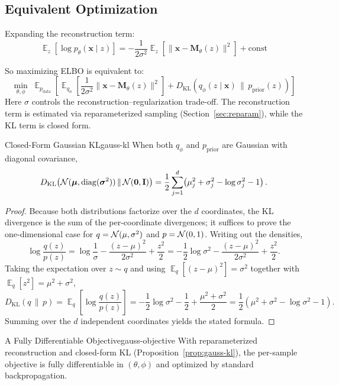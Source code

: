 \documentclass[11pt,a4paper]{article}
\DeclareMathOperator*{\E}{\mathbb{E}}
\DeclareMathOperator{\diag}{diag}
\newcommand{\bx}{\mathbf{x}} \newcommand{\by}{\mathbf{y}}
\newcommand{\bmu}{\boldsymbol{\mu}}
\newcommand{\bsigma}{\boldsymbol{\sigma}}
\newcommand{\KL}[2]{D_{\mathrm{KL}}\!\left(#1\,\|\,#2\right)}
\newcommand{\pdata}{p_{\mathrm{data}}}
\newcommand{\pprior}{p_{\mathrm{prior}}}
\begin{document}
\subsection{Equivalent Optimization}

Expanding the reconstruction term:
\[
    \E_z[\log p_\theta(\bx\mid z)]
    = -\frac{1}{2\sigma^2}\E_z\!\left[\|\bx-\mathbf{M}_\theta(z)\|^2\right]+\mathrm{const}
\]

So maximizing ELBO is equivalent to:
\[
    \min_{\theta,\phi}\;
    \E_{\pdata}\!\left[
        \E_{q_\phi}\!\left[\frac{1}{2\sigma^2}\|\bx-\mathbf{M}_\theta(z)\|^2\right]
        + \KL{q_\phi(z\mid \bx)}{\pprior(z)}
    \right]
\]
Here $\sigma$ controls the reconstruction--regularization trade-off. The reconstruction term is estimated via reparameterized sampling (Section~\ref{sec:reparam}), while the KL term is closed form.

\begin{proposition}{Closed-Form Gaussian KL}{gauss-kl}
When both $q_\phi$ and $\pprior$ are Gaussian with diagonal covariance,
\[
    \KL{\cN(\bmu,\diag(\bsigma^2))}{\cN(\mathbf{0},\mathbf{I})}
    = \frac{1}{2}\sum_{j=1}^{d}\!\left(\mu_j^2+\sigma_j^2-\log\sigma_j^2-1\right).
\]
\end{proposition}

\begin{proof}
Because both distributions factorize over the $d$ coordinates, the KL divergence is the sum of the per-coordinate divergences; it suffices to prove the one-dimensional case for $q=\mathcal{N}(\mu,\sigma^2)$ and $p=\mathcal{N}(0,1)$. Writing out the densities,
\[
    \log\frac{q(z)}{p(z)}
    = \log\frac{1}{\sigma} - \frac{(z-\mu)^2}{2\sigma^2} + \frac{z^2}{2}
    = -\frac{1}{2}\log\sigma^2 - \frac{(z-\mu)^2}{2\sigma^2} + \frac{z^2}{2}.
\]
Taking the expectation over $z\sim q$ and using $\E_q[(z-\mu)^2]=\sigma^2$ together with $\E_q[z^2]=\mu^2+\sigma^2$,
\[
    \KL{q}{p}
    = \E_q\!\left[\log\frac{q(z)}{p(z)}\right]
    = -\frac{1}{2}\log\sigma^2 - \frac{1}{2} + \frac{\mu^2+\sigma^2}{2}
    = \frac{1}{2}\!\left(\mu^2+\sigma^2-\log\sigma^2-1\right).
\]
Summing over the $d$ independent coordinates yields the stated formula.
\end{proof}

\begin{remark}{A Fully Differentiable Objective}{gauss-objective}
With reparameterized reconstruction and closed-form KL (Proposition~\ref{prop:gauss-kl}), the per-sample objective is fully differentiable in $(\theta,\phi)$ and optimized by standard backpropagation.
\end{remark}
\end{document}
